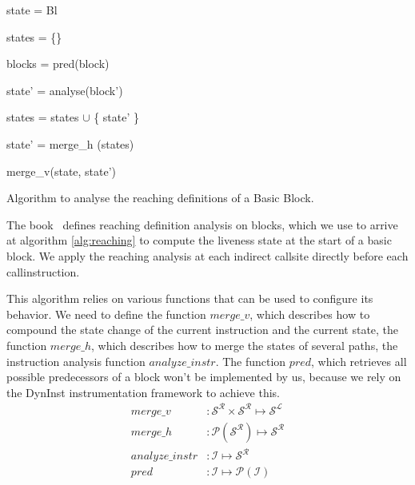   \begin{algorithm}[!h]
	\SetAlgoLined
	{
 	state = Bl
 	

	states = \{\}
	
	blocks = pred(block)
	
	 {
	
 		state' = analyse(block')
 		
		states = states $\cup$ \{ state' \}
	}

	state' = merge\_h (states)

	\Return merge\_v(state, state')

	}
\caption{Algorithm to analyse the reaching definitions of a Basic Block.}
\label{alg:reaching}
\end{algorithm}
%
%
The book~\cite{khedker2009data} defines reaching definition analysis on blocks, which we use to arrive at algorithm \ref{alg:reaching} to compute the liveness state at the start of a basic block. We apply the reaching analysis at each indirect callsite directly before each callinstruction.

This algorithm relies on various functions that can be used to configure its behavior. We need to define the 
function $merge\_v$, which describes how to compound the state change of the current instruction and the current state, 
the function $merge\_h$, which describes how to merge the states of several paths, the instruction analysis function
$analyze\_instr$. The function $pred$, which retrieves all possible predecessors of a block won't be implemented by us, 
because we rely on the DynInst instrumentation framework to achieve this.
\begin{subequations}
\label{eq:livenesscustom}
\begin{align}
merge\_v &: \mathcal{S}^\mathcal{R} \times \mathcal{S}^\mathcal{R} \mapsto \mathcal{S}^\mathcal{L}\\
merge\_h &: \mathcal{P}(\mathcal{S}^\mathcal{R}) \mapsto \mathcal{S}^\mathcal{R}\\
analyze\_instr &: \mathcal {I} \mapsto \mathcal{S}^\mathcal{R} \\
pred &: \mathcal{I} \mapsto \mathcal{P}(\mathcal{I})
\end{align}
\end{subequations}

